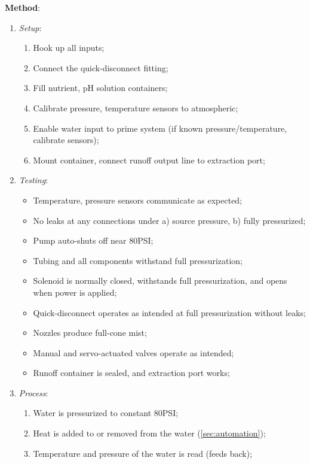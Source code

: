 \documentclass{../tex/report}
\begin{document}
\textbf{Method}:
\begin{enumerate}
    \item \textit{Setup}:
    \begin{enumerate}
        \item Hook up all inputs;
        \item Connect the quick-disconnect fitting;
        \item Fill nutrient, pH solution containers;
        \item Calibrate pressure, temperature sensors to atmospheric;
        \item Enable water input to prime system (if known pressure/temperature, calibrate sensors);
        \item Mount container, connect runoff output line to extraction port;
    \end{enumerate}
\newpage
    \item \textit{Testing}:
    \begin{itemize}
        \item Temperature, pressure sensors communicate as expected;
        \item No leaks at any connections under a) source pressure, b) fully pressurized;
        \item Pump auto-shuts off near 80PSI;
        \item Tubing and all components withstand full pressurization;
        \item Solenoid is normally closed, withstands full pressurization, and opens when power is applied;
        \item Quick-disconnect operates as intended at full pressurization without leaks;
        \item Nozzles produce full-cone mist;
        \item Manual and servo-actuated valves operate as intended;
        \item Runoff container is sealed, and extraction port works;
    \end{itemize}
    \item \textit{Process}:
    \begin{enumerate}
        \item Water is pressurized to constant 80PSI;
        \item Heat is added to or removed from the water (\ref{sec:automation}); %
        \item Temperature and pressure of the water is read (feeds back);

\end{enumerate}
\end{enumerate}
\end{document}
